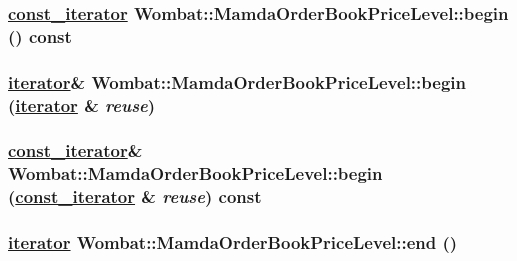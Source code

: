 \hypertarget{classWombat_1_1MamdaOrderBookPriceLevel_df499376eb089c8299e71d5891f1e36d}{
\subsubsection[begin]{\setlength{\rightskip}{0pt plus 5cm}\hyperlink{classWombat_1_1MamdaOrderBookPriceLevel_1_1iterator}{const\_\-iterator} Wombat::Mamda\-Order\-Book\-Price\-Level::begin () const}}
\label{classWombat_1_1MamdaOrderBookPriceLevel_df499376eb089c8299e71d5891f1e36d}


\hypertarget{classWombat_1_1MamdaOrderBookPriceLevel_ca14cc630063e838ae624687290f0545}{
\subsubsection[begin]{\setlength{\rightskip}{0pt plus 5cm}\hyperlink{classWombat_1_1MamdaOrderBookPriceLevel_1_1iterator}{iterator}\& Wombat::Mamda\-Order\-Book\-Price\-Level::begin (\hyperlink{classWombat_1_1MamdaOrderBookPriceLevel_1_1iterator}{iterator} \& {\em reuse})}}
\label{classWombat_1_1MamdaOrderBookPriceLevel_ca14cc630063e838ae624687290f0545}


\hypertarget{classWombat_1_1MamdaOrderBookPriceLevel_4a6b769b148fb84be0adb7df1d648ae0}{
\subsubsection[begin]{\setlength{\rightskip}{0pt plus 5cm}\hyperlink{classWombat_1_1MamdaOrderBookPriceLevel_1_1iterator}{const\_\-iterator}\& Wombat::Mamda\-Order\-Book\-Price\-Level::begin (\hyperlink{classWombat_1_1MamdaOrderBookPriceLevel_1_1iterator}{const\_\-iterator} \& {\em reuse}) const}}
\label{classWombat_1_1MamdaOrderBookPriceLevel_4a6b769b148fb84be0adb7df1d648ae0}


\hypertarget{classWombat_1_1MamdaOrderBookPriceLevel_15ad44839601a608e3e2765ea30b8331}{
\subsubsection[end]{\setlength{\rightskip}{0pt plus 5cm}\hyperlink{classWombat_1_1MamdaOrderBookPriceLevel_1_1iterator}{iterator} Wombat::Mamda\-Order\-Book\-Price\-Level::end ()}}
\label{classWombat_1_1MamdaOrderBookPriceLevel_15ad44839601a608e3e2765ea30b8331}


